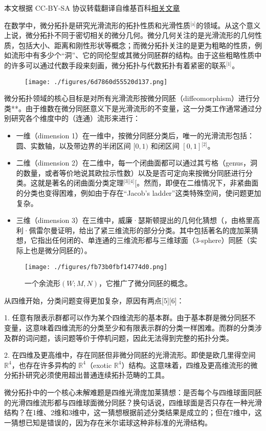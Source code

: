
本文根据 CC-BY-SA 协议转载翻译自维基百科\href{https://en.wikipedia.org/wiki/Differential_topology}{相关文章}

在数学中，微分拓扑是研究光滑流形的拓扑性质和光滑性质\(^\text{[a]}\)的领域。从这个意义上说，微分拓扑不同于密切相关的微分几何。微分几何关注的是光滑流形的几何性质，包括大小、距离和刚性形状等概念；而微分拓扑关注的是更为粗略的性质，例如流形中有多少个“洞”、它的同伦型或其微分同胚群的结构。由于这些粗略性质中的许多可以通过代数手段来刻画，微分拓扑与代数拓扑有着紧密的联系\(^\text{[1]}\)。
\begin{figure}[ht]
\centering
\texttt{[image: ./figures/6d7860d55520d137.png]}
\caption{} \label{fig_WFTP_1}
\end{figure}
微分拓扑领域的核心目标是对所有光滑流形按微分同胚（diffeomorphism）进行分类**。由于维数在微分同胚意义下是光滑流形的不变量，这一分类工作通常通过分别研究各个维度中的（连通）流形来进行：
\begin{itemize}
\item 一维（dimension 1）在一维中，按微分同胚分类后，唯一的光滑流形包括：圆、实数轴，以及带边界的半闭区间 $[0,1)$ 和闭区间 $[0,1]$\(^\text{[2]}\)。
\item 二维（dimension 2）在二维中，每一个闭曲面都可以通过其亏格（genus，洞的数量，或者等价地说其欧拉示性数）以及是否可定向来按微分同胚进行分类。这就是著名的闭曲面分类定理\(^\text{[3][4]}\)[。然而，即便在二维情况下，非紧曲面的分类也变得困难，例如由于存在“Jacob's ladder”这类特殊空间，使问题更加复杂。
\item 三维（dimension 3）在三维中，威廉·瑟斯顿提出的几何化猜想（，由格里高利·佩雷尔曼证明，给出了紧三维流形的部分分类。其中包括著名的庞加莱猜想，它指出任何闭的、单连通的三维流形都与三维球面（3-sphere）同胚（实际上也是微分同胚的）。
\end{itemize}
\begin{figure}[ht]
\centering
\texttt{[image: ./figures/fb73b0fbf14774d0.png]}
\caption{一个余流形$(W; M, N)$，它推广了微分同胚的概念。} \label{fig_WFTP_2}
\end{figure}
从四维开始，分类问题变得更加复杂，原因有两点[5][6]：

1. 任意有限表示群都可以作为某个四维流形的基本群。由于基本群是微分同胚不变量，这意味着四维流形的分类至少和有限表示群的分类一样困难。而群的分类涉及群的词问题，该问题等价于停机问题，因此无法得到完整的拓扑分类。

2. 在四维及更高维中，存在同胚但非微分同胚的光滑流形。即使是欧几里得空间 $\mathbb{R}^4$，也存在许多异构的 $\mathbb{R}^4$（exotic $\mathbb{R}^4$）结构。这意味着，四维及更高维流形的微分拓扑研究必须使用超出普通连续拓扑范畴的工具。

微分拓扑中的一个核心未解难题是四维光滑庞加莱猜想：是否每个与四维球面同胚的光滑四维流形都与四维球面微分同胚？换句话说，四维球面是否只存在一种光滑结构？在1维、2维和3维中，这一猜想根据前述分类结果是成立的；但在7维中，这一猜想已知是错误的，因为存在米尔诺球这种非标准的光滑结构。
